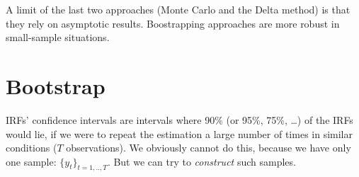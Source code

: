 \documentclass[
  12pt,
]{book}
\newenvironment{Shaded}{\begin{snugshade}}{\end{snugshade}}
\newcommand{\AttributeTok}[1]{\textcolor[rgb]{0.77,0.63,0.00}{#1}}
\newcommand{\ConstantTok}[1]{\textcolor[rgb]{0.00,0.00,0.00}{#1}}
\newcommand{\ControlFlowTok}[1]{\textcolor[rgb]{0.13,0.29,0.53}{\textbf{#1}}}
\newcommand{\DecValTok}[1]{\textcolor[rgb]{0.00,0.00,0.81}{#1}}
\newcommand{\FloatTok}[1]{\textcolor[rgb]{0.00,0.00,0.81}{#1}}
\newcommand{\FunctionTok}[1]{\textcolor[rgb]{0.00,0.00,0.00}{#1}}
\newcommand{\NormalTok}[1]{#1}
\newcommand{\OtherTok}[1]{\textcolor[rgb]{0.56,0.35,0.01}{#1}}
\newcommand{\SpecialCharTok}[1]{\textcolor[rgb]{0.00,0.00,0.00}{#1}}
\theoremstyle{definition}
\theoremstyle{definition}
\theoremstyle{definition}
\theoremstyle{definition}
\theoremstyle{remark}
\begin{document}
\begin{Shaded}
\end{Shaded}

A limit of the last two approaches (Monte Carlo and the Delta method) is that they rely on asymptotic results. Boostrapping approaches are more robust in small-sample situations.

\hypertarget{bootstrap}{%
\section{Bootstrap}\label{bootstrap}}

IRFs' confidence intervals are intervals where 90\% (or 95\%, 75\%, \ldots) of the IRFs would lie, if we were to repeat the estimation a large number of times in similar conditions (\(T\) observations). We obviously cannot do this, because we have only one sample: \(\{y_t\}_{t=1,..,T}\). But we can try to \emph{construct} such samples.
\end{document}
